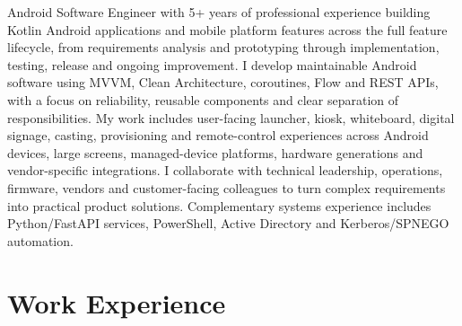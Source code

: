 \documentclass[11pt,a4paper]{article}
\begin{document}
\footnotesize{
Android Software Engineer with 5+ years of professional experience building Kotlin Android applications and mobile platform features across the full feature lifecycle, from requirements analysis and prototyping through implementation, testing, release and ongoing improvement. I develop maintainable Android software using MVVM, Clean Architecture, coroutines, Flow and REST APIs, with a focus on reliability, reusable components and clear separation of responsibilities. My work includes user-facing launcher, kiosk, whiteboard, digital signage, casting, provisioning and remote-control experiences across Android devices, large screens, managed-device platforms, hardware generations and vendor-specific integrations. I collaborate with technical leadership, operations, firmware, vendors and customer-facing colleagues to turn complex requirements into practical product solutions. Complementary systems experience includes Python/FastAPI services, PowerShell, Active Directory and Kerberos/SPNEGO automation.

}


\section*{Work Experience}
\end{document}
